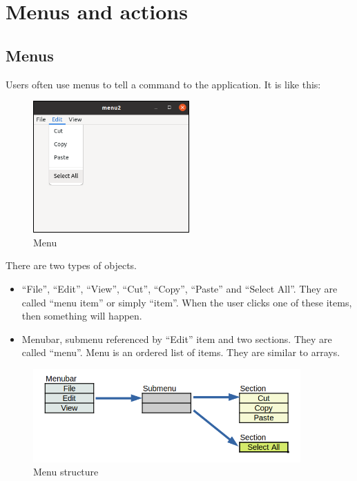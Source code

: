 \section{Menus and actions}\label{menus-and-actions}

\subsection{Menus}\label{menus}

Users often use menus to tell a command to the application. It is like
this:

\begin{figure}
\centering
\includegraphics[width=5.985cm,height=5.055cm]{../image/menu.png}
\caption{Menu}
\end{figure}

There are two types of objects.

\begin{itemize}
\tightlist
\item
  ``File'', ``Edit'', ``View'', ``Cut'', ``Copy'', ``Paste'' and
  ``Select All''. They are called ``menu item'' or simply ``item''. When
  the user clicks one of these items, then something will happen.
\item
  Menubar, submenu referenced by ``Edit'' item and two sections. They
  are called ``menu''. Menu is an ordered list of items. They are
  similar to arrays.
\end{itemize}

\begin{figure}
\centering
\includegraphics[width=10.23cm,height=3.57cm]{../image/menu_structure.png}
\caption{Menu structure}
\end{figure}

